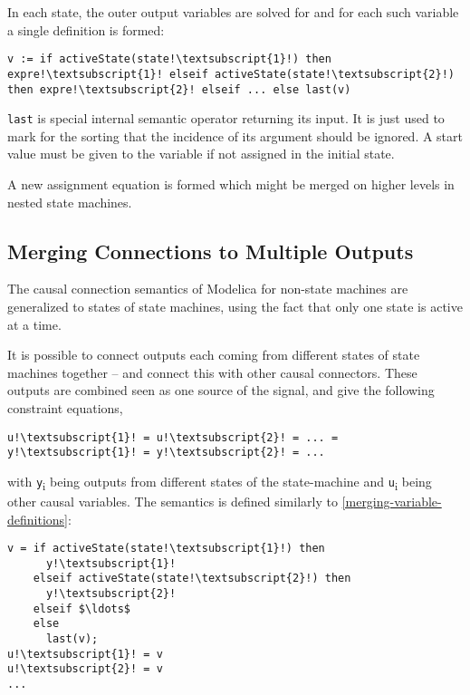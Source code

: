In each state, the outer output variables are solved for and for each
such variable a single definition is formed:
\begin{lstlisting}[language=modelica,escapechar=!]
v := if activeState(state!\textsubscript{1}!) then expre!\textsubscript{1}! elseif activeState(state!\textsubscript{2}!) then expre!\textsubscript{2}! elseif ... else last(v)
\end{lstlisting}

\lstinline!last! is special internal semantic operator returning its
input. It is just used to mark for the sorting that the incidence of its
argument should be ignored. A start value must be given to the variable
if not assigned in the initial state.

A new assignment equation is formed which might be merged on higher
levels in nested state machines.

\subsection{Merging Connections to Multiple Outputs}\label{merging-connections-to-multiple-outputs}

\begin{nonnormative}
The causal connection semantics of Modelica for non-state machines are generalized to states of state machines, using the fact that only one state is active at a time.
\end{nonnormative}

It is possible to connect outputs each coming from different states of state machines together -- and connect this with other causal connectors.
These outputs are combined seen as one source of the signal, and give the following constraint equations,
\begin{lstlisting}[language=modelica,escapechar=!]
u!\textsubscript{1}! = u!\textsubscript{2}! = ... = y!\textsubscript{1}! = y!\textsubscript{2}! = ...
\end{lstlisting}
with \lstinline!y!\textsubscript{i} being outputs from different states of the state-machine and \lstinline!u!\textsubscript{i} being other causal variables.
The semantics is defined similarly to \cref{merging-variable-definitions}:
\begin{lstlisting}[language=modelica,escapechar=!]
v = if activeState(state!\textsubscript{1}!) then
      y!\textsubscript{1}!
    elseif activeState(state!\textsubscript{2}!) then
      y!\textsubscript{2}!
    elseif $\ldots$
    else
      last(v);
u!\textsubscript{1}! = v
u!\textsubscript{2}! = v
...
\end{lstlisting}

